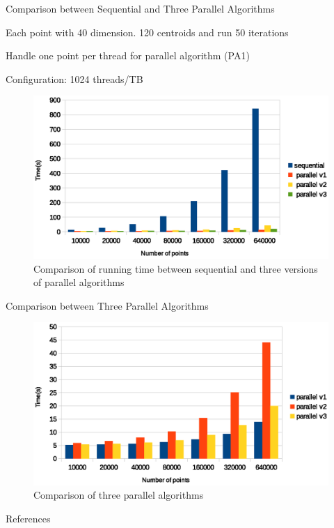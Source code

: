 \documentclass[
nopagebreaks,
style=klope,
fleqn]{powerdot}
\begin{document}
\begin{slide}{Comparison between Sequential and Three Parallel Algorithms}
  \begin{compactitem}
  \item{Each point with 40 dimension. 120 centroids and run 50 iterations}
  \item{Handle one point per thread for parallel algorithm (PA1)}
  \item{Configuration: 1024 threads/TB}
  \end{compactitem}
  \begin{figure}[!h]
    \captionsetup{font=scriptsize}
    \centering
    \includegraphics[width=0.7\linewidth]{fig/all_comparison}
    \caption{Comparison of running time between sequential and three versions of parallel algorithms}
    \label{fig:all}
  \end{figure}
\end{slide}

\begin{slide}{Comparison between Three Parallel Algorithms}
  \begin{figure}[!h]
    \centering  
    \includegraphics[width=0.9\linewidth]{fig/parallel_algorithm_comparison}
    \caption{Comparison of three parallel algorithms}
    \label{fig:par}
  \end{figure}
\end{slide}

\begin{slide} {References}
\footnotesize


\end{slide}
\end{document}
